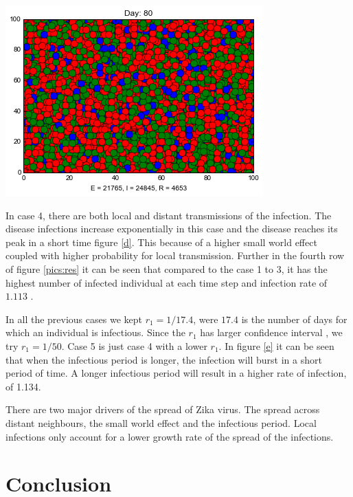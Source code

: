 \begin{minipage}{\linewidth}
\includegraphics[scale=0.28]{images/5t80.png} 

\label{pics:res}
\end{minipage}

In case 4, there are both local and distant transmissions of the infection. The disease infections increase exponentially in this case and the disease reaches its peak in a short time figure \ref{d}. This  because of a higher small world effect coupled with higher probability for local transmission. Further in the fourth row of figure \ref{pics:res} it can be seen that compared to the case 1 to 3, it has the highest number of infected individual at each time step and infection rate of $1.113$ .

In all the previous cases we kept $r_1 = 1/17.4$, were $17.4$ is the number of days for which an individual is infectious. Since the $r_1$ has larger confidence interval \citep{lessler2016times}, we try  $r_1 = 1/50$. Case 5 is just case 4 with a lower $r_1$. In figure \ref{e} it can be seen that when the infectious period is longer, the infection will burst in a short period of time. A longer infectious period will result in a higher rate of infection, of 1.134.

There are two major drivers of the spread of Zika virus. The spread across distant neighbours, the small world effect and the infectious period. Local infections only account for a lower growth rate of the spread of the infections.  

\section{Conclusion}

